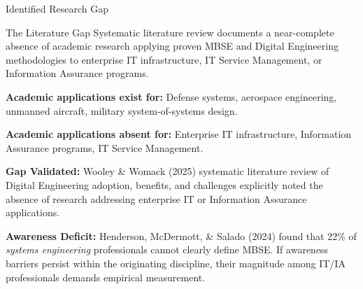 \documentclass{beamer}
\begin{document}
\begin{frame}[allowframebreaks]{Identified Research Gap}
  \begin{block}{The Literature Gap}
    Systematic literature review documents a near-complete absence of academic research applying proven MBSE and Digital Engineering methodologies to enterprise IT infrastructure, IT Service Management, or Information Assurance programs.
  \end{block}

  \vspace{0.2cm}
  \textbf{Academic applications exist for:} Defense systems, aerospace engineering, unmanned aircraft, military system-of-systems design.

  \vspace{0.2cm}
  \textbf{Academic applications absent for:} Enterprise IT infrastructure, Information Assurance programs, IT Service Management.

  \vspace{0.2cm}
  \textbf{Gap Validated:} Wooley \& Womack (2025) systematic literature review of Digital Engineering adoption, benefits, and challenges explicitly noted the absence of research addressing enterprise IT or Information Assurance applications.

  \vspace{0.2cm}
  \textbf{Awareness Deficit:} Henderson, McDermott, \& Salado (2024) found that 22\% of \textit{systems engineering} professionals cannot clearly define MBSE. If awareness barriers persist within the originating discipline, their magnitude among IT/IA professionals demands empirical measurement.
\end{frame}

\end{document}
